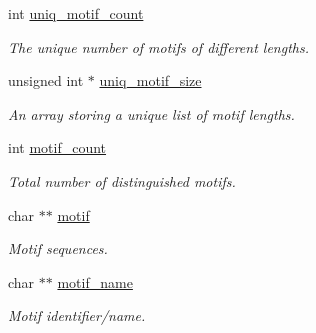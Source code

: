\begin{DoxyCompactItemize}
\item 
\mbox{\label{group__domains__up_ae17005ef8043aca2fc3864804cd5def6}} 
int \hyperlink{group__domains__up_ae17005ef8043aca2fc3864804cd5def6}{uniq\+\_\+motif\+\_\+count}
\begin{DoxyCompactList}\small\item\em The unique number of motifs of different lengths. \end{DoxyCompactList}\item 
\mbox{\label{group__domains__up_a2b484b0e19a47145db7055ada8b14159}} 
unsigned int $\ast$ \hyperlink{group__domains__up_a2b484b0e19a47145db7055ada8b14159}{uniq\+\_\+motif\+\_\+size}
\begin{DoxyCompactList}\small\item\em An array storing a unique list of motif lengths. \end{DoxyCompactList}\item 
\mbox{\label{group__domains__up_a5ad34148ea1d2e501f3e02029449546e}} 
int \hyperlink{group__domains__up_a5ad34148ea1d2e501f3e02029449546e}{motif\+\_\+count}
\begin{DoxyCompactList}\small\item\em Total number of distinguished motifs. \end{DoxyCompactList}\item 
\mbox{\label{group__domains__up_af285436bbdea4436ad2cedec65d48c75}} 
char $\ast$$\ast$ \hyperlink{group__domains__up_af285436bbdea4436ad2cedec65d48c75}{motif}
\begin{DoxyCompactList}\small\item\em Motif sequences. \end{DoxyCompactList}\item 
\mbox{\label{group__domains__up_ad061d55ef0b51d304c8dce88ebdbbf78}} 
char $\ast$$\ast$ \hyperlink{group__domains__up_ad061d55ef0b51d304c8dce88ebdbbf78}{motif\+\_\+name}
\begin{DoxyCompactList}\small\item\em Motif identifier/name. \end{DoxyCompactList}\item 
\mbox{\label{group__domains__up_a6a9f89ab7d147eb0ffd6cf8d77d178c0}} 

\end{DoxyCompactItemize}
